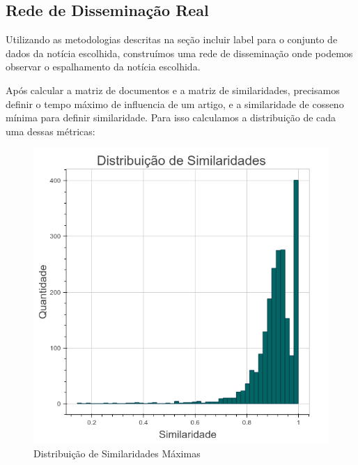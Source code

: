 \documentclass[a4paper,12pt]{article}
\begin{document}
\subsection{Rede de Disseminação Real}

Utilizando as metodologias descritas na seção {incluir label} para o conjunto de dados da notícia escolhida, construímos uma rede de disseminação
onde podemos observar o espalhamento da notícia escolhida.

Após calcular a matriz de documentos e a matriz de similaridades, precisamos definir o tempo máximo de influencia de um artigo, e a similaridade de cosseno
mínima para definir similaridade. Para isso calculamos a distribuição de cada uma dessas métricas:

\begin{figure}[h]
 \centering
 \includegraphics[scale=0.4]{./2.png}
 \caption{Distribuição de Similaridades Máximas}
\end{figure}
\end{document}
